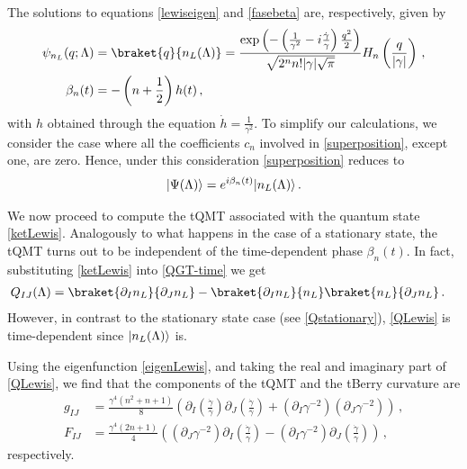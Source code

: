 \documentclass[12pt]{iopart}
\DeclarePairedDelimiter\ket{\lvert}{\rangle}
\begin{document}
The solutions to equations \eqref{lewiseigen} and \eqref{fasebeta}  are, respectively, given by
\begin{subequations}
\begin{align}
\psi_{n_L}(q;\Lambda)&=\braket{q}{n_L(\Lambda)} =\frac{\exp \left(-\left(\frac{1}{\gamma^2}-i \frac{\dot{\gamma}}{\gamma} \right)\frac{q^2}{2}\right)}{\sqrt{2^n n! |\gamma| \sqrt{\pi} }} H_n\left( \frac{q}{|\gamma|}\right)\,,
\label{eigenLewis} \\
\beta_n(t)&=-\left(n+\frac{1}{2}\right)h(t) \,, 
\end{align}
\end{subequations}
with $h$ obtained through the equation $\dot{h}=\tfrac{1}{\gamma^2}$. To simplify our calculations, we consider the case where all the coefficients $c_n$ involved in \eqref{superposition}, except one, are zero. Hence, under this consideration \eqref{superposition} reduces to
\begin{align}  \label{ketLewis}
\ket{\Psi(\Lambda)}= e^{i \beta_n(t)} \ket{n_L(\Lambda)}\,.
\end{align}

We now proceed to compute the tQMT associated with the quantum state \eqref{ketLewis}. Analogously to what happens in the case of a stationary state, the tQMT turns out to be independent of the time-dependent phase $\beta_n(t).$ In fact, substituting \eqref{ketLewis} into \eqref{QGT-time} we get
\begin{align}\label{QLewis}
      Q_{IJ}(\Lambda)&=\braket{\partial_I n_L}{\partial_J n_L} -\braket{\partial_I n_L}{n_L}\braket{n_L}{\partial_J n_L}\,.
\end{align}
However, in contrast to the stationary state case (see \eqref{Qstationary}), \eqref{QLewis} is time-dependent since $\ket{n_L(\Lambda)}$ is.

Using the eigenfunction \eqref{eigenLewis}, and taking the real and imaginary part of \eqref{QLewis}, we find that the components of the tQMT and the tBerry curvature are
\begin{subequations}
\begin{align}
    g_{IJ}  
    &=\frac{\gamma^4(n^2+n+1)}{8}\left( \partial_I \left( \frac{\dot{\gamma}}{\gamma}\right)\partial_J \left(\frac{\dot{\gamma}}{\gamma}\right)  +\left(\partial_I\gamma^{-2}\right)\left(\partial_J\gamma^{-2}\right)\right)\,,\label{metricatiempog}\\
     F_{IJ}  
    &=\frac{\gamma^4(2n+1)}{4}\left(\left(\partial_J \gamma^{-2}\right)\partial_I \left( \frac{\dot{\gamma}}{\gamma}\right)-\left(\partial_I\gamma^{-2}\right)\partial_J \left( \frac{\dot{\gamma}}{\gamma}\right)\right)\,, \label{eq:BCurvtiempog}
\end{align}
\end{subequations}
respectively.
\end{document}

